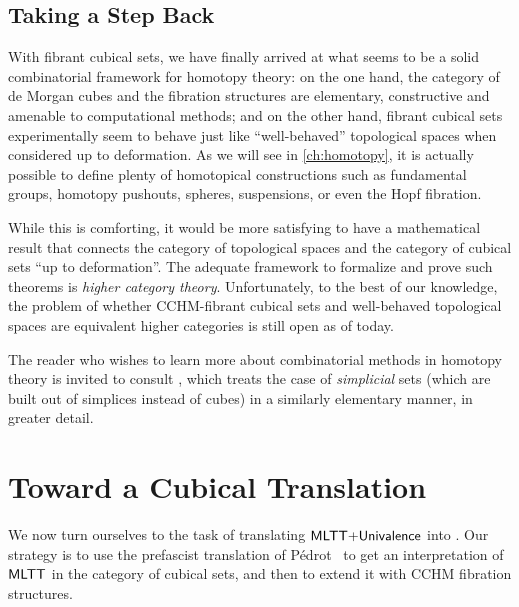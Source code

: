 

\subsection{Taking a Step Back}

With fibrant cubical sets, we have finally arrived at what seems to be a solid 
combinatorial framework for homotopy theory: 
% 
on the one hand, the category of de Morgan cubes and the fibration structures 
are elementary, constructive and amenable to computational methods;
% 
and on the other hand, fibrant cubical sets experimentally seem to behave just like 
``well-behaved'' topological spaces when considered up to deformation. As we
will see in \cref{ch:homotopy}, it is actually possible to define plenty of homotopical
constructions such as fundamental groups, homotopy pushouts, spheres, suspensions, 
or even the Hopf fibration.

While this is comforting, it would be more satisfying to have a mathematical 
result that connects the category of topological spaces and the category of
cubical sets ``up to deformation''. 
% 
The adequate framework to formalize and prove such theorems is \emph{higher 
category theory}. Unfortunately, to the best of our knowledge, the problem of 
whether CCHM-fibrant cubical sets and well-behaved topological spaces are 
equivalent higher categories is still open as of today.

The reader who wishes to learn more about combinatorial methods in homotopy 
theory is invited to consult , which treats the case 
of \emph{simplicial} sets (which are built out of simplices instead of cubes) in a 
similarly elementary manner, in greater detail.

\section{Toward a Cubical Translation}
\label{sec:cubical_trans}

We now turn ourselves to the task of translating 
\( \mathsf{MLTT}{+}\mathsf{Univalence} \) into \SetoidCCplus.
% 
Our strategy is to use the prefascist translation of Pédrot~  
to get an interpretation of \( \mathsf{MLTT} \) in the category of cubical sets, and 
then to extend it with CCHM fibration structures.

